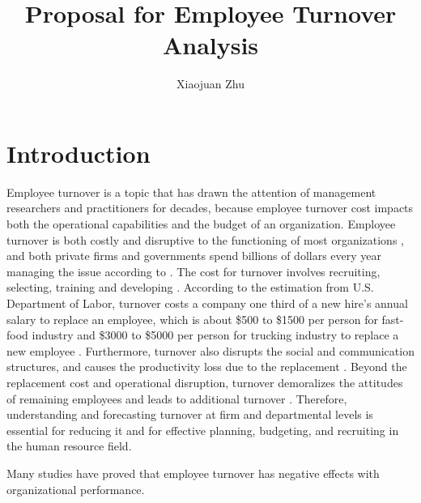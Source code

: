 \documentclass[12pt,letterpaper]{article}
\author{Xiaojuan Zhu}
\title{Proposal for Employee Turnover Analysis}
\begin{document}
	\maketitle
	
	
	\section{Introduction }
	Employee turnover is a topic that has drawn the attention of management researchers and practitioners for decades, because employee turnover cost impacts both the operational capabilities and the budget of an organization. Employee turnover is both costly and disruptive to the functioning of most organizations \citep{kacmar2006, mueller1989,staw1980}, and both private firms and governments spend billions of dollars every year managing the issue according to \citet{leonard2001}. %
	The cost for turnover involves recruiting, selecting, training and developing \citep{mobley1982, staw1980}. According to the estimation from U.S. Department of Labor, turnover costs a company one third of a new hire's annual salary to %
	replace an employee, which is about \$500 to \$1500 per person for fast-food industry and \$3000 to \$5000 per person for trucking industry to replace a new employee \citep{white1995}. Furthermore, turnover also disrupts the social and communication structures, and causes the productivity loss due to the replacement \citep{mobley1982}. Beyond the replacement cost and operational disruption, turnover demoralizes the attitudes of remaining employees and leads to additional turnover \citep{staw1980}. Therefore, understanding and forecasting turnover at firm and departmental levels is essential for reducing it \citep{kacmar2006} and for effective planning, budgeting, and recruiting in the human resource field. 
	
	Many studies have proved that employee turnover has negative effects with organizational performance. 
	
	
	
	
	
	
	
	
	
\end{document}
